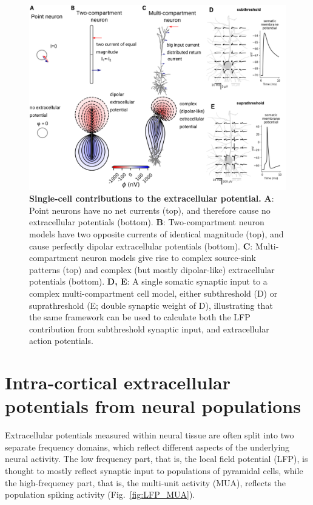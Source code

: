 \documentclass[preprint,11pt,authoryear]{elsarticle}
\begin{document}
\begin{figure}[!ht]
\begin{center}
\includegraphics[width=1\textwidth]{single_cell_EP}
\end{center}
\caption{\textbf{Single-cell contributions to the extracellular potential.} 
{\bf A}: Point neurons have no net currents (top), and therefore cause no extracellular potentials (bottom). 
{\bf B}: Two-compartment neuron models have two opposite currents
of identical magnitude (top), and cause perfectly dipolar extracellular potentials (bottom). 
{\bf C}: Multi-compartment neuron models \citep{Hay2011} give rise to complex source-sink patterns (top) and complex (but mostly dipolar-like) extracellular potentials (bottom). 
{\bf D, E}: A single somatic synaptic input to a complex multi-compartment cell model, either subthreshold (D) or suprathreshold (E; double synaptic weight of D), illustrating that the same framework can be used to calculate both the LFP contribution from subthreshold synaptic input, and extracellular action potentials. 
}
\label{fig:EP_morph}
\end{figure}

\section{Intra-cortical extracellular potentials from neural populations}
Extracellular potentials measured within neural tissue are often split into two separate frequency domains, which reflect different aspects of the underlying neural activity. 
The low frequency part, that is, the local field potential (LFP), is thought to mostly reflect synaptic input to populations of pyramidal cells, while the high-frequency part, that is, the multi-unit activity (MUA), reflects the population spiking activity (Fig.~\ref{fig:LFP_MUA}).
\end{document}
